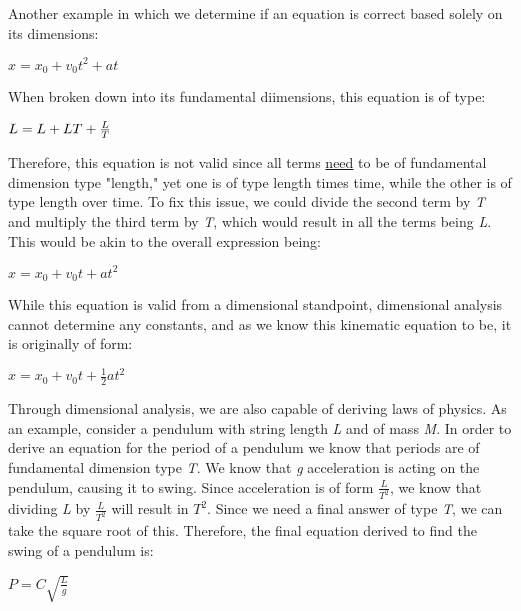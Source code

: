 \documentclass[12pt, letterpaper]{article}
\begin{document}
\bigskip

\noindent
Another example in which we determine if an equation is correct based solely on its dimensions:

\begin{center}
	$x = x_0 + v_0t^2 + at$

	\medskip

	When broken down into its fundamental diimensions, this equation is of type:

	\medskip

	$L = L + LT + \LARGE \frac{L}{T} \normalsize$

	\medskip

	Therefore, this equation is not valid since all terms \underline{need} to be of fundamental dimension
	type "length," yet one is of type length times time, while the other is of type length over time.
	To fix this issue, we could divide the second term by \textit{T} and multiply the third term by \textit{T},
	which would result in all the terms being \textit{L}. This would be akin to the overall expression being:

	\medskip

	$x = x_0 + v_0t + at^2$
	
	\medskip

	While this equation is valid from a dimensional standpoint, dimensional analysis cannot determine any constants,
	and as we know this kinematic equation to be, it is originally of form:

	\medskip

	$x = x_0 + v_0t + \frac{1}{2}at^2$

\end{center}

\bigskip

\noindent
Through dimensional analysis, we are also capable of deriving laws of physics. As an example, consider a pendulum
with string length \textit{L} and of mass \textit{M}. In order to derive an equation for the period of a pendulum 
we know that periods are of fundamental dimension type \textit{T}. We know that \textit{g} acceleration is acting
on the pendulum, causing it to swing. Since acceleration is of form $\frac{L}{T^2}$, we know that dividing \textit{L}
by $\frac{L}{T^2}$ will result in $T^2$. Since we need a final answer of type \textit{T}, we can take the square root
of this. Therefore, the final equation derived to find the swing of a pendulum is:

\begin{center}
	$P = C\sqrt{\frac{L}{g}}$
\end{center}
\end{document}
